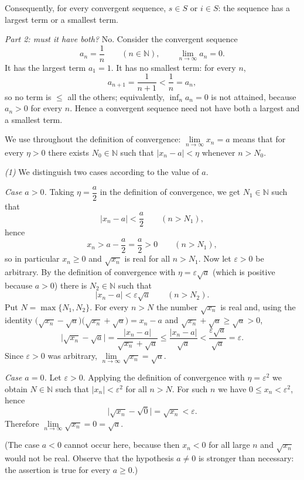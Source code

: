 \documentclass[11pt,a4paper]{article}
\newenvironment{solution}[1]{%
  \par\addvspace{1.7ex}%
  \noindent{\color{solutioncolor}\textbf{#1}}\hspace{0.55em}\ignorespaces}%
  {\par\addvspace{0.9ex}}
\begin{document}
\begin{solution}{Solution 2.1.7}
Consequently, for every convergent sequence, $s\in S$ or $i\in S$: the sequence has a largest term or a smallest term.

\emph{Part 2: must it have both?} No. Consider the convergent sequence
\[
a_n=\frac1n\qquad(n\in\mathbb{N}),\qquad \lim_{n\to\infty}a_n=0 .
\]
It has the largest term $a_1=1$. It has no smallest term: for every $n$,
\[
a_{n+1}=\frac{1}{n+1}<\frac1n=a_n ,
\]
so no term is $\le$ all the others; equivalently, $\inf_n a_n=0$ is not attained, because $a_n>0$ for every $n$. Hence a convergent sequence need not have both a largest and a smallest term.
\end{solution}

\begin{solution}{Solution 2.1.8}\label{xs:2.1.8}
We use throughout the definition of convergence: $\lim\limits_{n\to\infty}x_n=a$ means that for every $\eta>0$ there exists $N_0\in\mathbb{N}$ such that $|x_n-a|<\eta$ whenever $n>N_0$.

\emph{(1)} We distinguish two cases according to the value of $a$.

\emph{Case $a>0$.} Taking $\eta=\dfrac a2$ in the definition of convergence, we get $N_1\in\mathbb{N}$ such that
\[
|x_n-a|<\frac a2\qquad(n>N_1),
\]
hence
\[
x_n>a-\frac a2=\frac a2>0\qquad(n>N_1),
\]
so in particular $x_n\ge 0$ and $\sqrt{x_n}$ is real for all $n>N_1$. Now let $\varepsilon>0$ be arbitrary. By the definition of convergence with $\eta=\varepsilon\sqrt a$ (which is positive because $a>0$) there is $N_2\in\mathbb{N}$ such that
\[
|x_n-a|<\varepsilon\sqrt a\qquad(n>N_2).
\]
Put $N=\max\{N_1,N_2\}$. For every $n>N$ the number $\sqrt{x_n}$ is real and, using the identity $\bigl(\sqrt{x_n}-\sqrt a\bigr)\bigl(\sqrt{x_n}+\sqrt a\bigr)=x_n-a$ and $\sqrt{x_n}+\sqrt a\ge\sqrt a>0$,
\[
\bigl|\sqrt{x_n}-\sqrt a\bigr|
=\frac{|x_n-a|}{\sqrt{x_n}+\sqrt a}
\le\frac{|x_n-a|}{\sqrt a}
<\frac{\varepsilon\sqrt a}{\sqrt a}=\varepsilon .
\]
Since $\varepsilon>0$ was arbitrary, $\lim\limits_{n\to\infty}\sqrt{x_n}=\sqrt a$.

\emph{Case $a=0$.} Let $\varepsilon>0$. Applying the definition of convergence with $\eta=\varepsilon^2$ we obtain $N\in\mathbb{N}$ such that $|x_n|<\varepsilon^2$ for all $n>N$. For such $n$ we have $0\le x_n<\varepsilon^2$, hence
\[
\bigl|\sqrt{x_n}-\sqrt 0\bigr|=\sqrt{x_n}<\varepsilon .
\]
Therefore $\lim\limits_{n\to\infty}\sqrt{x_n}=0=\sqrt a$.

(The case $a<0$ cannot occur here, because then $x_n<0$ for all large $n$ and $\sqrt{x_n}$ would not be real. Observe that the hypothesis $a\ne 0$ is stronger than necessary: the assertion is true for every $a\ge 0$.)


\end{solution}
\end{document}
